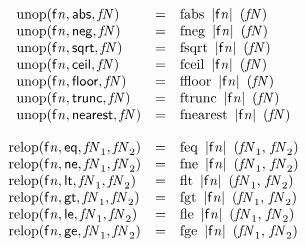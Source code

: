 $$
\begin{array}{@{}lcl@{}l@{}}
{\mathrm{unop}}({\mathsf{f}}{{\mathit{n}}}, \mathsf{abs}, {\mathit{fN}}) &=& {\mathrm{fabs}}~\,{|{\mathsf{f}}{{\mathit{n}}}|}~\,({\mathit{fN}}) &  \\
{\mathrm{unop}}({\mathsf{f}}{{\mathit{n}}}, \mathsf{neg}, {\mathit{fN}}) &=& {\mathrm{fneg}}~\,{|{\mathsf{f}}{{\mathit{n}}}|}~\,({\mathit{fN}}) &  \\
{\mathrm{unop}}({\mathsf{f}}{{\mathit{n}}}, \mathsf{sqrt}, {\mathit{fN}}) &=& {\mathrm{fsqrt}}~\,{|{\mathsf{f}}{{\mathit{n}}}|}~\,({\mathit{fN}}) &  \\
{\mathrm{unop}}({\mathsf{f}}{{\mathit{n}}}, \mathsf{ceil}, {\mathit{fN}}) &=& {\mathrm{fceil}}~\,{|{\mathsf{f}}{{\mathit{n}}}|}~\,({\mathit{fN}}) &  \\
{\mathrm{unop}}({\mathsf{f}}{{\mathit{n}}}, \mathsf{floor}, {\mathit{fN}}) &=& {\mathrm{ffloor}}~\,{|{\mathsf{f}}{{\mathit{n}}}|}~\,({\mathit{fN}}) &  \\
{\mathrm{unop}}({\mathsf{f}}{{\mathit{n}}}, \mathsf{trunc}, {\mathit{fN}}) &=& {\mathrm{ftrunc}}~\,{|{\mathsf{f}}{{\mathit{n}}}|}~\,({\mathit{fN}}) &  \\
{\mathrm{unop}}({\mathsf{f}}{{\mathit{n}}}, \mathsf{nearest}, {\mathit{fN}}) &=& {\mathrm{fnearest}}~\,{|{\mathsf{f}}{{\mathit{n}}}|}~\,({\mathit{fN}}) &  \\
\end{array}
$$

$$
\begin{array}{@{}lcl@{}l@{}}
{\mathrm{relop}}({\mathsf{f}}{{\mathit{n}}}, \mathsf{eq}, {\mathit{fN}}_{{1}}, {\mathit{fN}}_{{2}}) &=& {\mathrm{feq}}~\,{|{\mathsf{f}}{{\mathit{n}}}|}~\,({\mathit{fN}}_{{1}},\, {\mathit{fN}}_{{2}}) &  \\
{\mathrm{relop}}({\mathsf{f}}{{\mathit{n}}}, \mathsf{ne}, {\mathit{fN}}_{{1}}, {\mathit{fN}}_{{2}}) &=& {\mathrm{fne}}~\,{|{\mathsf{f}}{{\mathit{n}}}|}~\,({\mathit{fN}}_{{1}},\, {\mathit{fN}}_{{2}}) &  \\
{\mathrm{relop}}({\mathsf{f}}{{\mathit{n}}}, \mathsf{lt}, {\mathit{fN}}_{{1}}, {\mathit{fN}}_{{2}}) &=& {\mathrm{flt}}~\,{|{\mathsf{f}}{{\mathit{n}}}|}~\,({\mathit{fN}}_{{1}},\, {\mathit{fN}}_{{2}}) &  \\
{\mathrm{relop}}({\mathsf{f}}{{\mathit{n}}}, \mathsf{gt}, {\mathit{fN}}_{{1}}, {\mathit{fN}}_{{2}}) &=& {\mathrm{fgt}}~\,{|{\mathsf{f}}{{\mathit{n}}}|}~\,({\mathit{fN}}_{{1}},\, {\mathit{fN}}_{{2}}) &  \\
{\mathrm{relop}}({\mathsf{f}}{{\mathit{n}}}, \mathsf{le}, {\mathit{fN}}_{{1}}, {\mathit{fN}}_{{2}}) &=& {\mathrm{fle}}~\,{|{\mathsf{f}}{{\mathit{n}}}|}~\,({\mathit{fN}}_{{1}},\, {\mathit{fN}}_{{2}}) &  \\
{\mathrm{relop}}({\mathsf{f}}{{\mathit{n}}}, \mathsf{ge}, {\mathit{fN}}_{{1}}, {\mathit{fN}}_{{2}}) &=& {\mathrm{fge}}~\,{|{\mathsf{f}}{{\mathit{n}}}|}~\,({\mathit{fN}}_{{1}},\, {\mathit{fN}}_{{2}}) &  \\
\end{array}
$$


